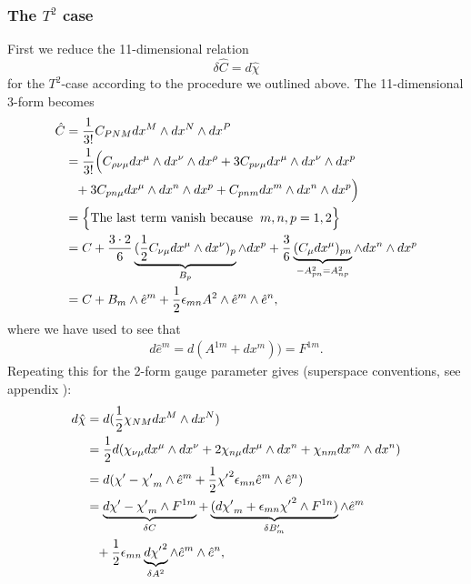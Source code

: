 \subsubsection{The $T^2$ case}
First we reduce the 11-dimensional relation
\begin{equation}
\delta \hat{C}=d \hat{\chi}
\label{tja}
\end{equation}
for the $T^2$-case according to the procedure we outlined above. The 11-dimensional 3-form becomes
\begin{align}
\hat{C} &= {1 \over {3!}} C_{PNM}dx^M \wedge dx^N \wedge dx^P \nonumber \\
&= {1 \over {3!}}\Big{(}C_{\rho \nu \mu}dx^{\mu} \wedge dx^{\nu} \wedge dx^{\rho} + 3C_{p \nu \mu}dx^{\mu} \wedge dx^{\nu} \wedge dx^{p} \nonumber \\
&\phantom{=} + 3 C_{p n \mu}dx^{\mu} \wedge dx^{n} \wedge dx^{p} +C_{pnm}dx^{m} \wedge dx^{n} \wedge dx^{p}\Big{)}\nonumber \\
&= \Big{\{ \mbox{The last term vanish because} \hspace{0.2cm}m,n,p=1,2\Big{\}}}\nonumber \\
&= C + {3 \cdot 2 \over 6} \underbrace{({1 \over 2}C_{\nu \mu}dx^{\mu} \wedge dx^{\nu})_p}_{B_{p}} \wedge dx^p + {3 \over 6} \underbrace{(C_{\mu}dx^{\mu})_{pn}}_{-A_{pn}^2 = A_{np}^2} \wedge dx^n \wedge dx^p \nonumber \\
&= C + B_{m} \wedge \hat{e}^m + {1 \over 2}{\epsilon}_{mn}A^2 \wedge \hat{e}^m \wedge \hat{e}^n,
\end{align}
where we have used  to see that
\begin{align}
d\hat e^m = d(A^{1m} + dx^m)) = F^{1m}.
\end{align}
Repeating this for the 2-form gauge parameter gives (superspace conventions, see appendix ):
\begin{align}
d\hat{\chi} &= d({1 \over 2}\chi_{NM}dx^M \wedge dx^N) \nonumber \\
&= {1 \over 2}d(\chi_{\nu \mu}dx^{\mu} \wedge dx^{\nu} + 2\chi_{n \mu}dx^{\mu} \wedge dx^n + \chi_{nm}dx^{m} \wedge dx^n)\nonumber \\
&= d(\chi' - {\chi'}_m \wedge \hat{e}^m + {1 \over 2}{\chi'}^2 {\epsilon}_{mn} \hat{e}^m \wedge \hat{e}^n)\nonumber \\
&= \underbrace{d\chi'-{\chi'}_m \wedge F^{1m}}_{\delta C} + \underbrace{(d{\chi'}_m + {\epsilon}_{mn}{\chi'}^2 \wedge F^{1n})}_{\delta B_{m}'} \wedge \hat{e}^m \nonumber \\
&\phantom{=}+{1 \over 2} {\epsilon}_{mn} \underbrace{d{\chi'}^2}_{\delta A^2} \wedge \hat{e}^m \wedge \hat{e}^n,
\label{tja2}
\end{align}
